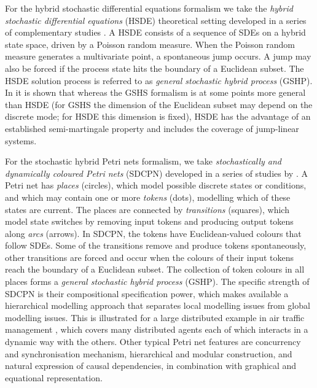 \documentclass[copyright,creativecommons]{eptcs}
\begin{document}
For the hybrid stochastic differential equations formalism we take the
\emph{hybrid stochastic differential equations} (HSDE) theoretical
setting developed in a series of complementary studies
\cite{Blom2003,BlomBakkerEverdijPark2003b,Krystul2006,KrystulBlomBagchi2007}.
A HSDE consists of a sequence of SDEs
on a hybrid state space, driven by a Poisson random measure. When
the Poisson random measure generates a multivariate point, a
spontaneous jump occurs. A jump may also be forced if the process
state hits the boundary of a Euclidean subset. The HSDE solution
process is referred to as \emph{general stochastic hybrid process}
(GSHP). In \cite{EverdijBlom2009} it is shown that whereas the
GSHS formalism is at some points more general than HSDE (for GSHS
the dimension of the Euclidean subset may depend on the discrete
mode; for HSDE this dimension is fixed), HSDE has the advantage of
an established semi-martingale property and includes the coverage
of jump-linear systems.

For the stochastic hybrid Petri nets formalism, we take \emph{stochastically and
dynamically coloured Petri nets} (SDCPN) developed in a series of
studies by
\cite{EverdijBlom2003,EverdijBlom2005,EverdijBlom2006}. A Petri
net has \emph{places} (circles), which model possible discrete
states or conditions, and which may contain one or more
\emph{tokens} (dots), modelling which of these states are current.
The places are connected by \emph{transitions} (squares), which
model state switches by removing input tokens and producing output
tokens along \emph{arcs} (arrows). In SDCPN, the tokens have
Euclidean-valued colours that follow SDEs. Some of the transitions
remove and produce tokens
spontaneously, other transitions are forced and occur
when the colours of their input tokens reach the boundary of a
Euclidean subset. The collection of token colours in all places
forms a \emph{general stochastic hybrid process} (GSHP). The
specific strength of SDCPN is their compositional specification
power, which makes available a hierarchical modelling approach
that separates local modelling issues from global modelling
issues. This is illustrated for a large distributed example in air
traffic management \cite{EverdijKlompstraBlomKleinObbink2006},
which covers many distributed agents each of which interacts in a
dynamic way with the others. Other typical Petri net features are
concurrency and synchronisation mechanism, hierarchical and
modular construction, and natural expression of causal
dependencies, in combination with graphical and equational
representation.
\end{document}
